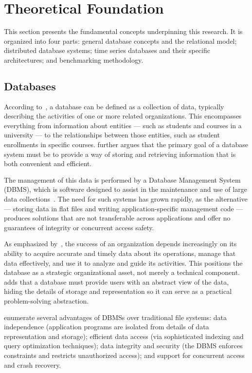 \section{Theoretical Foundation}
\label{sec:theoretical}

This section presents the fundamental concepts underpinning this research. It is organized
into four parts: general database concepts and the relational model; distributed database
systems; time series databases and their specific architectures; and benchmarking methodology.

\subsection{Databases}

According to~\cite{Ramakrishnan2003}, a database can be defined as a collection of data,
typically describing the activities of one or more related organizations. This encompasses
everything from information about entities --- such as students and courses in a university ---
to the relationships between those entities, such as student enrollments in specific courses.
\cite{Silberschatz2020} further argues that the primary goal of a database system must be to
provide a way of storing and retrieving information that is both convenient and efficient.

The management of this data is performed by a Database Management System (DBMS), which is
software designed to assist in the maintenance and use of large data collections~\cite{Ramakrishnan2003}.
The need for such systems has grown rapidly, as the alternative --- storing data in flat files
and writing application-specific management code --- produces solutions that are not transferable
across applications and offer no guarantees of integrity or concurrent access safety.

As emphasized by~\cite{Ramakrishnan2003}, the success of an organization depends increasingly
on its ability to acquire accurate and timely data about its operations, manage that data
effectively, and use it to analyze and guide its activities. This positions the database as a
strategic organizational asset, not merely a technical component. \cite{Silberschatz2020} adds
that a database must provide users with an abstract view of the data, hiding the details of
storage and representation so it can serve as a practical problem-solving abstraction.

\cite{Ramakrishnan2003} enumerate several advantages of DBMSs over traditional file systems:
data independence (application programs are isolated from details of data representation and
storage); efficient data access (via sophisticated indexing and query optimization techniques);
data integrity and security (the DBMS enforces constraints and restricts unauthorized access);
and support for concurrent access and crash recovery.

